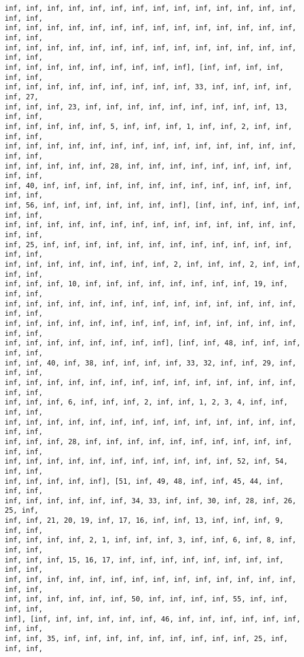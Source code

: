 \documentclass[11pt]{article}
\begin{document}
\begin{Verbatim}[commandchars=\\\{\}]
inf, inf, inf, inf, inf, inf, inf, inf, inf, inf, inf, inf, inf, inf, inf, inf,
inf, inf, inf, inf, inf, inf, inf, inf, inf, inf, inf, inf, inf, inf, inf, inf,
inf, inf, inf, inf, inf, inf, inf, inf, inf, inf, inf, inf, inf, inf, inf, inf,
inf, inf, inf, inf, inf, inf, inf, inf, inf], [inf, inf, inf, inf, inf, inf,
inf, inf, inf, inf, inf, inf, inf, inf, inf, 33, inf, inf, inf, inf, inf, 27,
inf, inf, inf, 23, inf, inf, inf, inf, inf, inf, inf, inf, inf, 13, inf, inf,
inf, inf, inf, inf, inf, 5, inf, inf, inf, 1, inf, inf, 2, inf, inf, inf, inf,
inf, inf, inf, inf, inf, inf, inf, inf, inf, inf, inf, inf, inf, inf, inf, inf,
inf, inf, inf, inf, inf, 28, inf, inf, inf, inf, inf, inf, inf, inf, inf, inf,
inf, 40, inf, inf, inf, inf, inf, inf, inf, inf, inf, inf, inf, inf, inf, inf,
inf, 56, inf, inf, inf, inf, inf, inf, inf], [inf, inf, inf, inf, inf, inf, inf,
inf, inf, inf, inf, inf, inf, inf, inf, inf, inf, inf, inf, inf, inf, inf, inf,
inf, 25, inf, inf, inf, inf, inf, inf, inf, inf, inf, inf, inf, inf, inf, inf,
inf, inf, inf, inf, inf, inf, inf, inf, 2, inf, inf, inf, 2, inf, inf, inf, inf,
inf, inf, inf, 10, inf, inf, inf, inf, inf, inf, inf, inf, 19, inf, inf, inf,
inf, inf, inf, inf, inf, inf, inf, inf, inf, inf, inf, inf, inf, inf, inf, inf,
inf, inf, inf, inf, inf, inf, inf, inf, inf, inf, inf, inf, inf, inf, inf, inf,
inf, inf, inf, inf, inf, inf, inf, inf], [inf, inf, 48, inf, inf, inf, inf, inf,
inf, inf, 40, inf, 38, inf, inf, inf, inf, 33, 32, inf, inf, 29, inf, inf, inf,
inf, inf, inf, inf, inf, inf, inf, inf, inf, inf, inf, inf, inf, inf, inf, inf,
inf, inf, inf, 6, inf, inf, inf, 2, inf, inf, 1, 2, 3, 4, inf, inf, inf, inf,
inf, inf, inf, inf, inf, inf, inf, inf, inf, inf, inf, inf, inf, inf, inf, inf,
inf, inf, inf, 28, inf, inf, inf, inf, inf, inf, inf, inf, inf, inf, inf, inf,
inf, inf, inf, inf, inf, inf, inf, inf, inf, inf, inf, 52, inf, 54, inf, inf,
inf, inf, inf, inf, inf], [51, inf, 49, 48, inf, inf, 45, 44, inf, inf, inf,
inf, inf, inf, inf, inf, inf, 34, 33, inf, inf, 30, inf, 28, inf, 26, 25, inf,
inf, inf, 21, 20, 19, inf, 17, 16, inf, inf, 13, inf, inf, inf, 9, inf, inf,
inf, inf, inf, inf, 2, 1, inf, inf, inf, 3, inf, inf, 6, inf, 8, inf, inf, inf,
inf, inf, inf, 15, 16, 17, inf, inf, inf, inf, inf, inf, inf, inf, inf, inf,
inf, inf, inf, inf, inf, inf, inf, inf, inf, inf, inf, inf, inf, inf, inf, inf,
inf, inf, inf, inf, inf, inf, 50, inf, inf, inf, inf, 55, inf, inf, inf, inf,
inf], [inf, inf, inf, inf, inf, inf, 46, inf, inf, inf, inf, inf, inf, inf, inf,
inf, inf, 35, inf, inf, inf, inf, inf, inf, inf, inf, inf, 25, inf, inf, inf,

\end{Verbatim}
\end{document}
